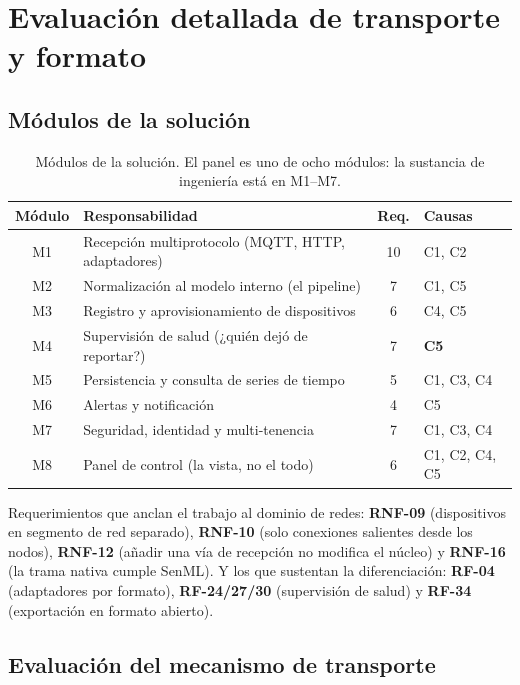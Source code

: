 \chapter[Evaluación detallada]{Evaluación detallada de transporte y formato}
\label{anx:evaluacion}
\small

\section{Módulos de la solución}

\begin{table}[H]
\centering\footnotesize
\begin{tabular}{@{}cL{6.2cm}cL{3.2cm}@{}}
\toprule
\textbf{Módulo} & \textbf{Responsabilidad} & \textbf{Req.} & \textbf{Causas} \\
\midrule
M1 & Recepción multiprotocolo (MQTT, HTTP, adaptadores) & 10 & C1, C2 \\
M2 & Normalización al modelo interno (el pipeline) & 7 & C1, C5 \\
M3 & Registro y aprovisionamiento de dispositivos & 6 & C4, C5 \\
M4 & Supervisión de salud (¿quién dejó de reportar?) & 7 & \textbf{C5} \\
M5 & Persistencia y consulta de series de tiempo & 5 & C1, C3, C4 \\
M6 & Alertas y notificación & 4 & C5 \\
M7 & Seguridad, identidad y multi-tenencia & 7 & C1, C3, C4 \\
M8 & Panel de control (la vista, no el todo) & 6 & C1, C2, C4, C5 \\
\bottomrule
\end{tabular}
\caption{Módulos de la solución. El panel es uno de ocho módulos: la sustancia de ingeniería está en
M1--M7.}
\label{tab:modulos}
\end{table}

Requerimientos que anclan el trabajo al dominio de redes: \textbf{RNF-09} (dispositivos en segmento
de red separado), \textbf{RNF-10} (solo conexiones salientes desde los nodos), \textbf{RNF-12}
(añadir una vía de recepción no modifica el núcleo) y \textbf{RNF-16} (la trama nativa cumple SenML).
Y los que sustentan la diferenciación: \textbf{RF-04} (adaptadores por formato), \textbf{RF-24/27/30}
(supervisión de salud) y \textbf{RF-34} (exportación en formato abierto).

\section{Evaluación del mecanismo de transporte}
\label{sec:transporte}

